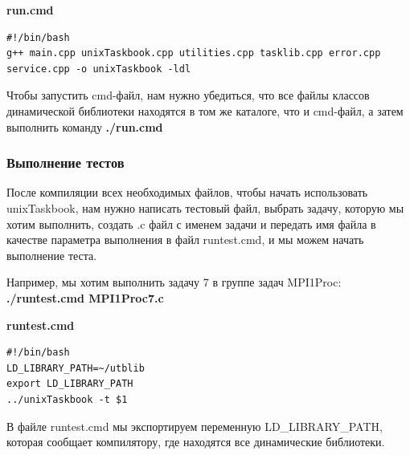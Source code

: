 \centerline{\textbf{run.cmd}}

\lstset{language=bash}
\begin{lstlisting}
#!/bin/bash
g++ main.cpp unixTaskbook.cpp utilities.cpp tasklib.cpp error.cpp service.cpp -o unixTaskbook -ldl
\end{lstlisting}

Чтобы запустить cmd-файл, нам нужно убедиться, что все файлы классов динамической 
библиотеки находятся в том же каталоге, что и cmd-файл, а затем выполнить команду \textbf{./run.cmd}

\subsubsection{Выполнение тестов}

После компиляции всех необходимых файлов, чтобы начать использовать unixTaskbook, нам 
нужно написать тестовый файл, выбрать задачу, которую мы хотим выполнить, создать .c файл 
с именем задачи и передать имя файла в качестве параметра выполнения в файл runtest.cmd, и 
мы можем начать выполнение теста.

Например, мы хотим выполнить задачу 7 в группе задач MPI1Proc: 
\\ \textbf{./runtest.cmd MPI1Proc7.c}

\centerline{\textbf{runtest.cmd}}

\lstset{language=bash}
\begin{lstlisting}
#!/bin/bash
LD_LIBRARY_PATH=~/utblib
export LD_LIBRARY_PATH
../unixTaskbook -t $1
\end{lstlisting}

В файле runtest.cmd мы экспортируем переменную LD\_LIBRARY\_PATH, 
которая сообщает компилятору, где находятся все динамические библиотеки.

